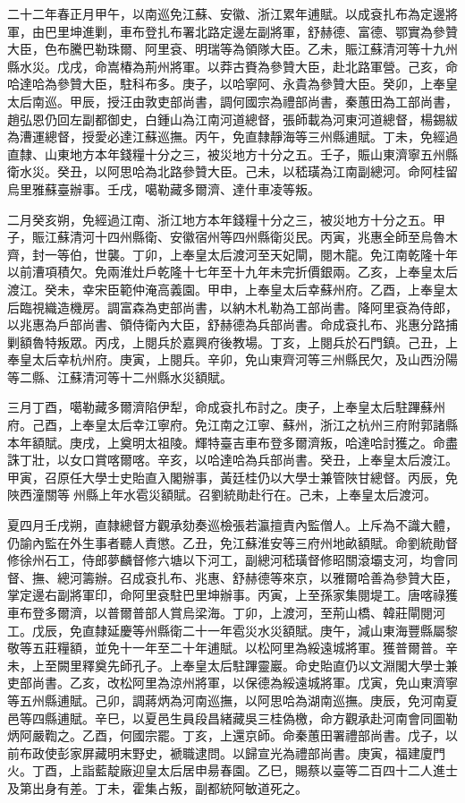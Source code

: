 \begin{pinyinscope}
二十二年春正月甲午，以南巡免江蘇、安徽、浙江累年逋賦。以成袞扎布為定邊將軍，由巴里坤進剿，車布登扎布署北路定邊左副將軍，舒赫德、富德、鄂實為參贊大臣，色布騰巴勒珠爾、阿里袞、明瑞等為領隊大臣。乙未，賑江蘇清河等十九州縣水災。戊戌，命嵩椿為荊州將軍。以莽古賚為參贊大臣，赴北路軍營。己亥，命哈達哈為參贊大臣，駐科布多。庚子，以哈寧阿、永貴為參贊大臣。癸卯，上奉皇太后南巡。甲辰，授汪由敦吏部尚書，調何國宗為禮部尚書，秦蕙田為工部尚書，趙弘恩仍回左副都御史，白鍾山為江南河道總督，張師載為河東河道總督，楊錫紱為漕運總督，授愛必達江蘇巡撫。丙午，免直隸靜海等三州縣逋賦。丁未，免經過直隸、山東地方本年錢糧十分之三，被災地方十分之五。壬子，賑山東濟寧五州縣衛水災。癸丑，以阿思哈為北路參贊大臣。己未，以嵇璜為江南副總河。命阿桂留烏里雅蘇臺辦事。壬戌，噶勒藏多爾濟、達什車凌等叛。

二月癸亥朔，免經過江南、浙江地方本年錢糧十分之三，被災地方十分之五。甲子，賑江蘇清河十四州縣衛、安徽宿州等四州縣衛災民。丙寅，兆惠全師至烏魯木齊，封一等伯，世襲。丁卯，上奉皇太后渡河至天妃閘，閱木龍。免江南乾隆十年以前漕項積欠。免兩淮灶戶乾隆十七年至十九年未完折價銀兩。乙亥，上奉皇太后渡江。癸未，幸宋臣範仲淹高義園。甲申，上奉皇太后幸蘇州府。乙酉，上奉皇太后臨視織造機房。調富森為吏部尚書，以納木札勒為工部尚書。降阿里袞為侍郎，以兆惠為戶部尚書、領侍衛內大臣，舒赫德為兵部尚書。命成袞扎布、兆惠分路捕剿額魯特叛眾。丙戌，上閱兵於嘉興府後教場。丁亥，上閱兵於石門鎮。己丑，上奉皇太后幸杭州府。庚寅，上閱兵。辛卯，免山東齊河等三州縣民欠，及山西汾陽等二縣、江蘇清河等十二州縣水災額賦。

三月丁酉，噶勒藏多爾濟陷伊犁，命成袞扎布討之。庚子，上奉皇太后駐蹕蘇州府。己酉，上奉皇太后幸江寧府。免江南之江寧、蘇州，浙江之杭州三府附郭諸縣本年額賦。庚戌，上奠明太祖陵。輝特臺吉車布登多爾濟叛，哈達哈討獲之。命盡誅丁壯，以女口賞喀爾喀。辛亥，以哈達哈為兵部尚書。癸丑，上奉皇太后渡江。甲寅，召原任大學士史貽直入閣辦事，黃廷桂仍以大學士兼管陜甘總督。丙辰，免陜西潼關等州縣上年水雹災額賦。召劉統勛赴行在。己未，上奉皇太后渡河。

夏四月壬戌朔，直隸總督方觀承劾奏巡檢張若瀛擅責內監僧人。上斥為不識大體，仍諭內監在外生事者聽人責懲。乙丑，免江蘇淮安等三府州地畝額賦。命劉統勛督修徐州石工，侍郎夢麟督修六塘以下河工，副總河嵇璜督修昭關滾壩支河，均會同督、撫、總河籌辦。召成袞扎布、兆惠、舒赫德等來京，以雅爾哈善為參贊大臣，掌定邊右副將軍印，命阿里袞駐巴里坤辦事。丙寅，上至孫家集閱堤工。唐喀祿獲車布登多爾濟，以普爾普部人賞烏梁海。丁卯，上渡河，至荊山橋、韓莊閘閱河工。戊辰，免直隸延慶等州縣衛二十一年雹災水災額賦。庚午，減山東海豐縣屬黎敬等五莊糧額，並免十一年至二十年逋賦。以松阿里為綏遠城將軍。獲普爾普。辛未，上至闕里釋奠先師孔子。上奉皇太后駐蹕靈巖。命史貽直仍以文淵閣大學士兼吏部尚書。乙亥，改松阿里為涼州將軍，以保德為綏遠城將軍。戊寅，免山東濟寧等五州縣逋賦。己卯，調蔣炳為河南巡撫，以阿思哈為湖南巡撫。庚辰，免河南夏邑等四縣逋賦。辛巳，以夏邑生員段昌緒藏吳三桂偽檄，命方觀承赴河南會同圖勒炳阿嚴鞫之。乙酉，何國宗罷。丁亥，上還京師。命秦蕙田署禮部尚書。戊子，以前布政使彭家屏藏明末野史，褫職逮問。以歸宣光為禮部尚書。庚寅，福建廈門火。丁酉，上詣藍靛廠迎皇太后居申昜春園。乙巳，賜蔡以臺等二百四十二人進士及第出身有差。丁未，霍集占叛，副都統阿敏道死之。


\end{pinyinscope}
